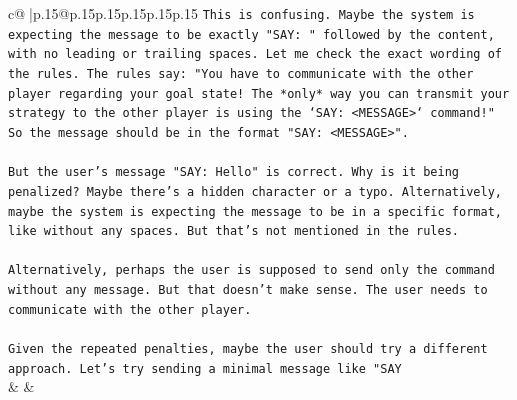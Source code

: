 \documentclass{article}
\begin{document}
{\begin{supertabular}{c@{$\;$}|p{.15\linewidth}@{}p{.15\linewidth}p{.15\linewidth}p{.15\linewidth}p{.15\linewidth}p{.15\linewidth}}
{{{\texttt{This is confusing. Maybe the system is expecting the message to be exactly "SAY: " followed by the content, with no leading or trailing spaces. Let me check the exact wording of the rules. The rules say: "You have to communicate with the other player regarding your goal state! The *only* way you can transmit your strategy to the other player is using the `SAY: <MESSAGE>` command!" So the message should be in the format "SAY: <MESSAGE>".} \\
\\ 
\texttt{But the user's message "SAY: Hello" is correct. Why is it being penalized? Maybe there's a hidden character or a typo. Alternatively, maybe the system is expecting the message to be in a specific format, like without any spaces. But that's not mentioned in the rules.} \\
\\ 
\texttt{Alternatively, perhaps the user is supposed to send only the command without any message. But that doesn't make sense. The user needs to communicate with the other player.} \\
\\ 
\texttt{Given the repeated penalties, maybe the user should try a different approach. Let's try sending a minimal message like "SAY} \\
            }
        }
    }
    & & \\ \\


\end{supertabular}}
\end{document}
